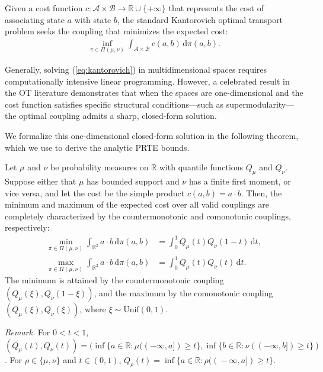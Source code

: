 Given a cost function $c: \mathcal{A} \times \mathcal{B} \to \mathbb{R} \cup \{+\infty\}$ that represents the cost of associating state $a$ with state $b$, the standard Kantorovich optimal transport problem seeks the coupling that minimizes the expected cost:
\begin{align}
    \inf_{\pi \in \Pi(\mu, \nu)} \int_{\mathcal{A} \times \mathcal{B}} c(a, b) \, \mathrm{d}\pi(a, b). \label{eq:kantorovich}
\end{align}

Generally, solving (\ref{eq:kantorovich}) in multidimensional spaces requires computationally intensive linear programming. However, a celebrated result in the OT literature demonstrates that when the spaces are one-dimensional and the cost function satisfies specific structural conditions---such as supermodularity---the optimal coupling admits a sharp, closed-form solution.

We formalize this one-dimensional closed-form solution in the following theorem, which we use to derive the analytic PRTE bounds.

\begin{theorem} \label{thm:1d_ot}
    Let $\mu$ and $\nu$ be probability measures on $\mathbb{R}$ with quantile functions $Q_\mu$ and $Q_\nu$. Suppose either that $\mu$ has bounded support and $\nu$ has a finite first moment, or vice versa, and let the cost be the simple product $c(a,b) = a \cdot b$. Then, the minimum and maximum of the expected cost over all valid couplings are completely characterized by the countermonotonic and comonotonic couplings, respectively:
    \begin{align*}
        \min_{\pi \in \Pi(\mu, \nu)} \int_{\mathbb{R}^2} a \cdot b \, \mathrm{d}\pi(a, b) &= \int_0^1 Q_\mu(t) Q_\nu(1-t) \, \mathrm{d}t, \\
        \max_{\pi \in \Pi(\mu, \nu)} \int_{\mathbb{R}^2} a \cdot b \, \mathrm{d}\pi(a, b) &= \int_0^1 Q_\mu(t) Q_\nu(t) \, \mathrm{d}t.
    \end{align*}
    The minimum is attained by the countermonotonic coupling $(Q_\mu(\xi), Q_\nu(1-\xi))$, and the maximum by the comonotonic coupling $(Q_\mu(\xi), Q_\nu(\xi))$, where $\xi \sim \mathrm{Unif}(0,1)$.
\end{theorem}

\noindent\textit{Remark.} For $0<t<1$, $(Q_\mu(t),Q_\nu(t))=(\inf\{a\in\mathbb R:\mu(( -\infty,a])\geqslant t\},\inf\{b\in\mathbb R:\nu(( -\infty,b])\geqslant t\})$. For $\rho\in\{\mu,\nu\}$ and $t\in(0,1)$, $Q_\rho(t)=\inf\{a\in\mathbb R:\rho((\! -\infty,a])\geqslant t\}$.

